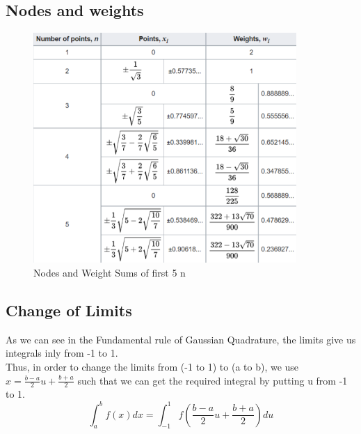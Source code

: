 \documentclass[12pt]{article}
\begin{document}
\subsection*{Nodes and weights}
\begin{figure}[H]
    \centering
    \includegraphics[width=10cm]{weg.png}
    \caption{Nodes and Weight Sums of first 5 n}
\end{figure}

\subsection{Change of Limits}
As we can see in the Fundamental rule of Gaussian Quadrature, the limits give us integrals inly from -1 to 1.\\
Thus, in order to change the limits from (-1 to 1) to (a to b), we use $x=\frac{b-a}{2} u+\frac{b+a}{2}$ such that we can get the required integral by putting u from -1 to 1.
\begin{equation*}
    \int_{a}^{b} f(x) d x=\int_{-1}^{1} f\left(\frac{b-a}{2} u+\frac{b+a}{2}\right) d u
\end{equation*}
\end{document}
